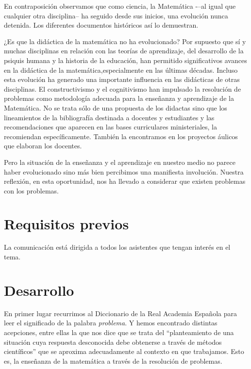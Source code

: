 \documentclass[oneside,spanish]{amsart}
\numberwithin{equation}{section}
\numberwithin{figure}{section}
\theoremstyle{definition}
\begin{document}
En contraposición observamos que como ciencia, la Matemática -–al igual que cualquier otra disciplina-- ha seguido desde sus inicios, una evolución nunca detenida. Los diferentes documentos históricos así lo demuestran. 

¿Es que la didáctica de la matemática no ha evolucionado? Por supuesto que sí y muchas disciplinas en relación con las teorías de aprendizaje, del desarrollo de la psiquis humana y la historia de la educación, han permitido significativos avances en la didáctica de la matemática,especialmente en las últimas décadas. Incluso esta evolución ha generado una importante  influencia en las didácticas de otras disciplinas. El constructivismo y el cognitivismo han impulsado la resolución de problemas como metodología adecuada para la enseñanza y aprendizaje de la Matemática. No se trata sólo de una propuesta de los didactas sino que los lineamientos de la bibliografía destinada a docentes y estudiantes y las recomendaciones que aparecen en las bases curriculares ministeriales, la recomiendan específicamente. También la encontramos en los proyectos áulicos que elaboran los docentes.

Pero la situación de la enseñanza y el aprendizaje en nuestro medio no parece haber evolucionado sino más bien percibimos una manifiesta involución. Nuestra reflexión, en esta oportunidad, nos ha llevado a considerar que existen problemas con los problemas.

\section{Requisitos previos}

La comunicación está dirigida a todos los asistentes que tengan interés en el tema.

\section{Desarrollo}

En primer lugar recurrimos al Diccionario de la Real Academia Española para leer el significado de la palabra \textit{problema}. Y hemos encontrado distintas acepciones, entre ellas la que nos dice que se trata del “planteamiento de una situación cuya respuesta desconocida debe obtenerse a través de métodos científicos” que se aproxima adecuadamente al contexto en que trabajamos. Esto es, la enseñanza de la matemática a través de la resolución de problemas.
\end{document}
